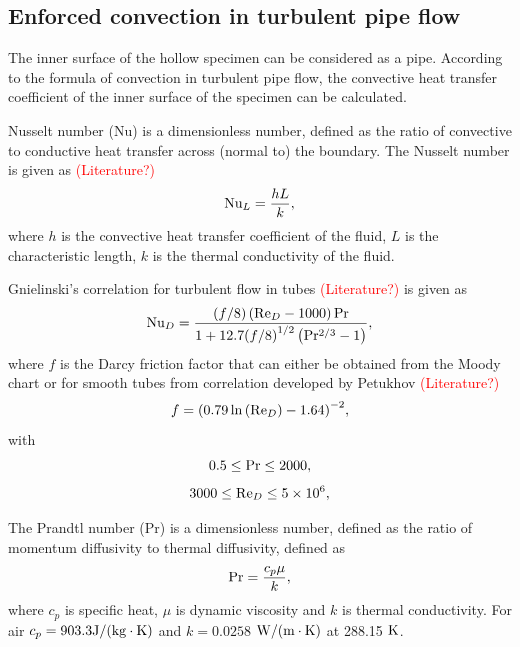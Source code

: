 \documentclass[preprint,5p,twocolumn,10pt,sort&compress]{elsarticle}
\newcommand{\marked}[1]{\textcolor{red}{#1}}
\begin{document}
\subsection{Enforced convection in turbulent pipe flow}
The inner surface of the hollow specimen can be considered as a pipe.
According to the formula of convection in turbulent pipe flow, the convective heat transfer coefficient of the inner surface of the specimen can be calculated.

Nusselt number (Nu) is a dimensionless number, defined as the ratio of convective to conductive heat transfer across (normal to) the boundary.
The Nusselt number is given as \marked{(Literature?)}
\begin{equation}
{\rm{N}}{{\rm{u}}_L} = \frac{{hL}}{k},
\end{equation}
where $h$ is the convective heat transfer coefficient of the fluid, $L$ is the characteristic length, $k$ is the thermal conductivity of the fluid.

Gnielinski's correlation for turbulent flow in tubes \marked{(Literature?)} is given as
\begin{equation}
{\rm{N}}{{\rm{u}}_D} = \frac{{\left( {f/8} \right)\left( {{\rm{R}}{{\rm{e}}_D} - 1000} \right){\rm{Pr}}}}{{1 + 12.7{{(f/8)}^{1/2}}\left( {{\rm{P}}{{\rm{r}}^{2/3}} - 1} \right)}},
\end{equation}
where $f$ is the Darcy friction factor that can either be obtained from the Moody chart or for smooth tubes from correlation developed by Petukhov \marked{(Literature?)}
\begin{equation}
f = {\left( {0.79\ln \left( {{\rm{R}}{{\rm{e}}_D}} \right) - 1.64} \right)^{ - 2}},
\end{equation}
with
\begin{equation}
0.5 \le {\rm{Pr}} \le 2000,
\end{equation}
\begin{equation}
3000 \le {\rm{R}}{{\rm{e}}_D} \le 5 \times {10^6},
\end{equation}

The Prandtl number (Pr) is a dimensionless number, defined as the ratio of momentum diffusivity to thermal diffusivity, defined as
\begin{equation}
{\rm{Pr}} = \frac{{{c_p}\mu }}{k},
\end{equation}
where
$c_{p}$ is specific heat, $\mu$ is dynamic viscosity and $k$ is thermal conductivity. For air $c_{p}=903.3 {\rm{J/(kg}} \cdot {\rm{K}})$ and $k=0.0258$ ${\rm{W/(m}} \cdot {\rm{K}})$ at 288.15 ${\rm{K}}$.
\end{document}
